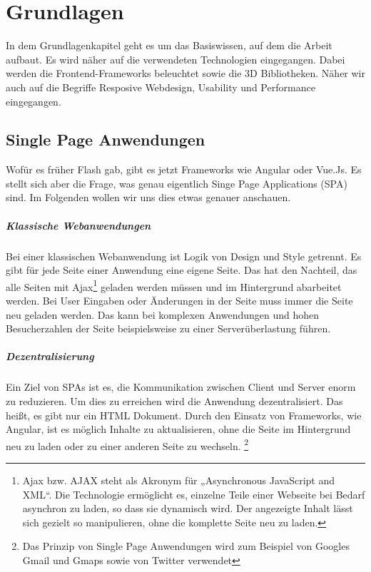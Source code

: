 %
%
%
\chapter{Grundlagen}
\label{cha:grundlagen}
%
%
In dem Grundlagenkapitel geht es um das Basiswissen, auf dem die Arbeit aufbaut. Es wird näher auf die verwendeten Technologien eingegangen. Dabei werden die Frontend-Frameworks beleuchtet sowie die 3D Bibliotheken. Näher wir auch auf die Begriffe Resposive Webdesign, Usability und Performance eingegangen.
%
%
%
%
%
\section{Single Page Anwendungen}
\label{sec:spa}
%
Wofür es früher Flash gab, gibt es jetzt Frameworks wie Angular oder Vue.Js. Es stellt sich aber die Frage, was genau eigentlich Singe Page Applications (SPA) sind. Im Folgenden wollen wir uns dies etwas genauer anschauen.
\paragraph{Klassische Webanwendungen}
Bei einer klassischen Webanwendung ist Logik von Design und Style getrennt. Es gibt für jede Seite einer Anwendung eine eigene Seite. Das hat den Nachteil, das alle Seiten mit Ajax\footnote{Ajax bzw. AJAX steht als Akronym für „Asynchronous JavaScript and XML“. Die Technologie ermöglicht es, einzelne Teile einer Webseite bei Bedarf asynchron zu laden, so dass sie dynamisch wird. Der angezeigte Inhalt lässt sich gezielt so manipulieren, ohne die komplette Seite neu zu laden.} geladen werden müssen und im Hintergrund abarbeitet werden. Bei User Eingaben oder Änderungen in der Seite muss immer die Seite neu geladen werden. Das kann bei komplexen Anwendungen und hohen Besucherzahlen der Seite beispielsweise zu einer Serverüberlastung führen.
\paragraph{Dezentralisierung}
%
Ein Ziel von SPAs ist es, die Kommunikation zwischen Client und Server enorm zu reduzieren. Um dies zu erreichen wird die Anwendung dezentralisiert. Das heißt, es gibt nur ein HTML Dokument\cite{domin_was_2018}. Durch den Einsatz von Frameworks, wie Angular, ist es möglich Inhalte zu aktualisieren, ohne die Seite im Hintergrund neu zu laden oder zu einer anderen Seite zu wechseln.
\footnote{Das Prinzip von Single Page Anwendungen wird zum Beispiel von Googles Gmail und Gmaps sowie von Twitter verwendet}
%
%
%
%
%
